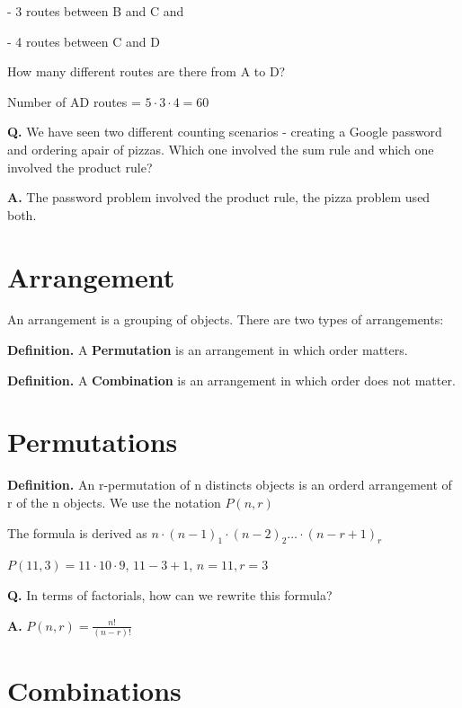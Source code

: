 \documentclass{article}
\begin{document}
\quad - 3 routes between B and C and

\quad - 4 routes between C and D

How many different routes are there from A to D?

Number of AD routes = $5 \cdot 3 \cdot 4 = 60$

\pagebreak

\text{}

\textbf{Q.} We have seen two different counting scenarios - creating a Google password and ordering apair of pizzas. Which one involved the sum rule and which one involved the product rule?

\textbf{A.} The password problem involved the product rule, the pizza problem used both.

\section{Arrangement}

An arrangement is a grouping of objects. There are two types of arrangements:

\textbf{Definition.} A \textbf{Permutation} is an arrangement in which order matters.

\textbf{Definition.} A \textbf{Combination} is an arrangement in which order does not matter.

\section{Permutations}

\textbf{Definition.} An r-permutation of n distincts objects is an orderd arrangement of r of the n objects. We use the notation $P(n,r)$

The formula is derived as $n \cdot (n-1)_1 \cdot (n-2)_2 \dots \cdot (n-r + 1)_r$

$P(11,3) = 11 \cdot 10 \cdot 9$, $11 - 3 + 1$, $n = 11, r = 3$

\vspace{1cm}

\textbf{Q.} In terms of factorials, how can we rewrite this formula?

\textbf{A.} $P(n,r) = \displaystyle\frac{n!}{(n-r)!}$

\vspace{1cm}

\section{Combinations}
\end{document}
